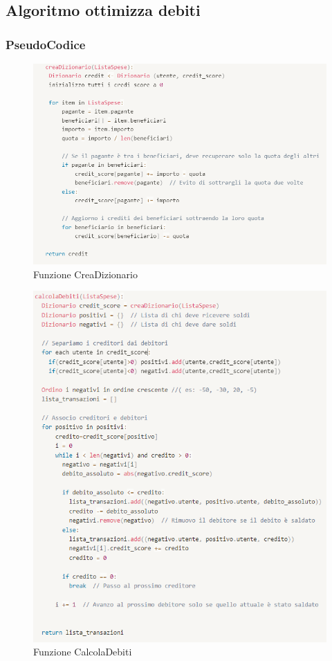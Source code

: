 \subsection{Algoritmo ottimizza debiti}

\subsubsection{PseudoCodice}
\begin{figure}[H]
    \centering
    \includegraphics[scale=0.9]{images/CreaDizionario.png}
    \caption{Funzione CreaDizionario}
\end{figure}

\begin{figure}[H]
    \centering
    \includegraphics[scale=0.9]{images/CalcolaDebiti.png}
    \caption{Funzione CalcolaDebiti}
\end{figure}


